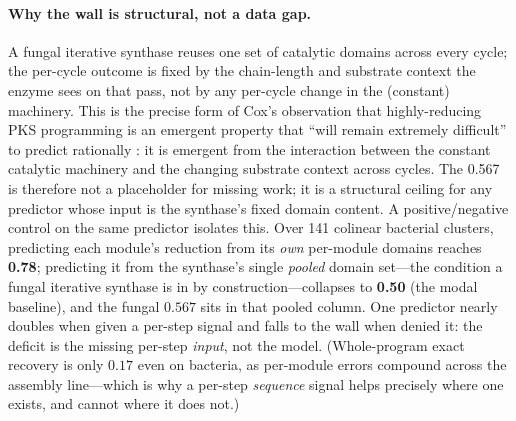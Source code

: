 \paragraph{Why the wall is structural, not a data gap.} A fungal iterative synthase reuses one set of
catalytic domains across every cycle; the per-cycle outcome is fixed by the chain-length and substrate
context the enzyme sees on that pass, not by any per-cycle change in the (constant) machinery. This is the
precise form of Cox's observation that highly-reducing PKS programming is an emergent property that
``will remain extremely difficult'' to predict rationally \citep{cox2023}: it is emergent from the
interaction between the constant catalytic machinery and the changing substrate context across cycles. The
0.567 is therefore not a placeholder for missing work; it is a structural ceiling for any predictor whose
input is the synthase's fixed domain content. A positive/negative control on the same predictor isolates
this. Over 141 colinear bacterial clusters, predicting each module's reduction from its \emph{own}
per-module domains reaches \textbf{0.78}; predicting it from the synthase's single \emph{pooled} domain
set---the condition a fungal iterative synthase is in by construction---collapses to \textbf{0.50} (the
modal baseline), and the fungal $0.567$ sits in that pooled column. One predictor nearly doubles when
given a per-step signal and falls to the wall when denied it: the deficit is the missing per-step
\emph{input}, not the model. (Whole-program exact recovery is only $0.17$ even on bacteria, as per-module
errors compound across the assembly line---which is why a per-step \emph{sequence} signal helps precisely
where one exists, and cannot where it does not.)

